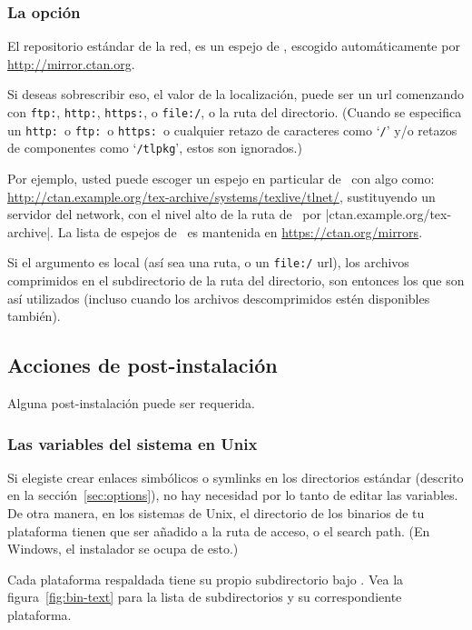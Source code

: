 \documentclass{article}
\begin{document}
\subsubsection{La opción }
\label{sec:location}

El repositorio estándar de la red, es un espejo de \CTAN{}, escogido
automáticamente por \url{http://mirror.ctan.org}.

Si deseas sobrescribir eso, el valor de la localización, puede ser un
url comenzando con \texttt{ftp:}, \texttt{http:}, \texttt{https:}, o \texttt{file:/}, o
la ruta del directorio. (Cuando se especifica un \texttt{http:}\ o
\texttt{ftp:}\ o \texttt{https:}\ o cualquier retazo de caracteres como `\texttt{/}' y/o
retazos de componentes como `\texttt{/tlpkg}', estos son ignorados.)

Por ejemplo, usted puede escoger un espejo en particular de \CTAN\ con
algo como:
\url{http://ctan.example.org/tex-archive/systems/texlive/tlnet/},
sustituyendo un servidor del network, con el nivel alto de la ruta de
\CTAN\ por |ctan.example.org/tex-archive|. La lista de espejos de
\CTAN\ es mantenida en \url{https://ctan.org/mirrors}.

Si el argumento es local (así sea una ruta, o un \texttt{file:/} url),
los archivos comprimidos en el subdirectorio  de la ruta
del directorio, son entonces los que son así utilizados (incluso cuando los archivos
descomprimidos estén disponibles también). 

\subsection{Acciones de post-instalación}
\label{sec:postinstall}

Alguna post-instalación puede ser requerida.

\subsubsection{Las variables del sistema en Unix}
\label{sec:env}

Si elegiste crear enlaces simbólicos o symlinks en los directorios
estándar (descrito en la sección~\ref{sec:options}), no hay necesidad
por lo tanto de editar las variables. De otra manera, en los sistemas
de Unix, el directorio de los binarios de tu plataforma tienen que ser
añadido a la ruta de acceso, o el search path. (En Windows, el
instalador se ocupa de esto.)

Cada plataforma respaldada tiene su propio subdirectorio bajo
. Vea la figura~\ref{fig:bin-text} para la lista
de subdirectorios y su correspondiente plataforma. 
\end{document}
